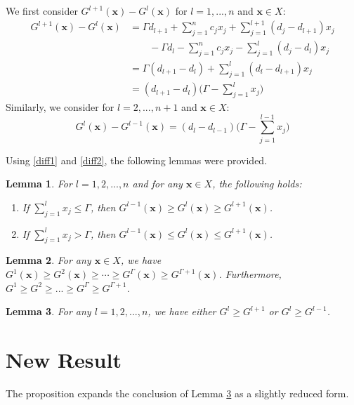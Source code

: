 \documentclass[letterpaper, 10pt]{article}
\newtheorem{lemma}{Lemma}
\renewcommand{\vec}[1]{\bm{#1}}
\begin{document}
We first consider $G^{l+1}(\vec{x}) - G^l(\vec{x})$ for $l=1,...,n$ and $\vec{x}\in X$:
\begin{align}
G^{l+1}(\vec{x}) - G^l(\vec{x}) 
&= \Gamma d_{l+1} + \sum_{j=1}^n c_j x_j + \sum_{j=1}^{l+1} (d_j-d_{l+1})x_j \nonumber\\
&\qquad -  \Gamma d_{l} - \sum_{j=1}^n c_j x_j - \sum_{j=1}^{l} (d_j-d_{l})x_j \nonumber\\
&= \Gamma (d_{l+1}-d_l) + \sum_{j=1}^l (d_l - d_{l+1}) x_j \nonumber\\
&= (d_{l+1} - d_l) \bigg( \Gamma - \sum_{j=1}^l x_j \bigg ) \label{diff1}
\end{align}
Similarly, we consider for $l=2,...,n+1$ and $\vec{x}\in X$:
\begin{equation} \label{diff2}
G^{l}(\vec{x}) - G^{l-1}(\vec{x}) = (d_l - d_{l-1}) \bigg( \Gamma - \sum_{j=1}^{l-1} x_j \bigg )
\end{equation}

Using \eqref{diff1} and \eqref{diff2}, the following lemmas were provided.

\begin{lemma} \label{lem:prop}
For $l=1,2,...,n$ and for any $\vec{x}\in X$, the following holds:
\begin{enumerate}

\item If $\sum_{j=1}^l x_j \leq \Gamma$, then $G^{l-1}(\vec{x}) \geq G^l(\vec{x}) \geq G^{l+1}(\vec{x})$.

\item If $\sum_{j=1}^l x_j > \Gamma$, then $G^{l-1}(\vec{x}) \leq G^l(\vec{x}) \leq G^{l+1}(\vec{x})$.

\end{enumerate}
\end{lemma}

\begin{lemma} \label{lem:prop3}
For any $\vec{x}\in X$, we have 
$
	G^1(\vec{x}) \geq G^2(\vec{x}) \geq \cdots \geq G^\Gamma(\vec{x}) \geq G^{\Gamma+1} (\vec{x})
$.
Furthermore, 
$
G^1 \geq G^2 \geq ... \geq G^\Gamma \geq G^{\Gamma+1}
$.
\end{lemma}

\begin{lemma} \label{lem:prop5}
For any $l=1,2,...,n$, we have either $G^l\geq G^{l+1}$ or $G^l\geq G^{l-1}$.

\end{lemma}

\section{New Result}
The proposition expands the conclusion of Lemma \ref{lem:prop5} as a slightly reduced form.
\end{document}
